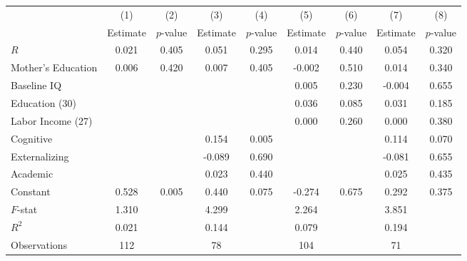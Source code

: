\begin{tabular}{lcccccccc} \toprule
 & (1) & (2) & (3) & (4) & (5) & (6) & (7) & (8) \\ 
 & Estimate  & $p$-value  & Estimate  & $p$-value  & Estimate  & $p$-value  & Estimate  & $p$-value  \\  \midrule
$R$ &     0.021 &     0.405 &     0.051 &     0.295 &     0.014 &     0.440 &     0.054 &     0.320 \\  
Mother's Education &     0.006 &     0.420 &     0.007 &     0.405 &    -0.002 &     0.510 &     0.014 &     0.340 \\  
Baseline IQ &         &         &         &         &     0.005 &     0.230 &    -0.004 &     0.655 \\  
Education (30) &         &         &         &         &     0.036 &     0.085 &     0.031 &     0.185 \\  
Labor Income (27) &         &         &         &         &     0.000 &     0.260 &     0.000 &     0.380 \\  
Cognitive &         &         &     0.154 &     0.005 &         &         &     0.114 &     0.070 \\  
Externalizing &         &         &    -0.089 &     0.690 &         &         &    -0.081 &     0.655 \\  
Academic &         &         &     0.023 &     0.440 &         &         &     0.025 &     0.435 \\  
Constant &     0.528 &     0.005 &     0.440 &     0.075 &    -0.274 &     0.675 &     0.292 &     0.375 \\  \midrule
$F$-stat &     1.310 &         &     4.299 &         &     2.264 &         &     3.851 &         \\  
$R^2$ &     0.021 &         &     0.144 &         &     0.079 &         &     0.194 &         \\  
Observations &   112 &         &    78 &         &   104 &         &    71 &         \\  
\bottomrule
\end{tabular}

